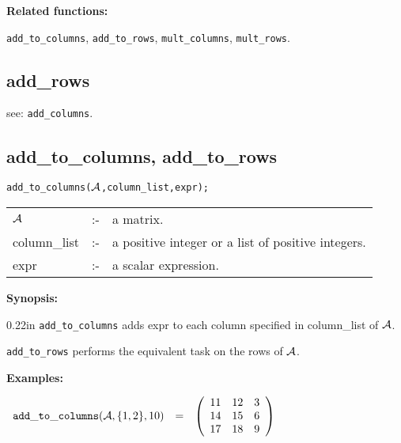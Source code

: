 {\bf Related functions:}

\hspace*{0.175in} {\tt add\_to\_columns}, {\tt add\_to\_rows},
{\tt mult\_columns}, {\tt mult\_rows}.


\subsection{add\_rows}

\hspace*{0.175in} see: {\tt add\_columns}.


\subsection{add\_to\_columns, add\_to\_rows}


\hspace*{0.175in} {\tt add\_to\_columns(${\cal A}$,column\_list,expr);}

\hspace*{0.1in}
\begin{tabular}{l l l}
${\cal A}$   &:-& a matrix. \\
column\_list &:-& a positive integer or a list of positive integers. \\
expr        &:-& a scalar expression.
\end{tabular}

{\bf Synopsis:} %

\begin{addtolength}{\leftskip}{0.22in}
{\tt add\_to\_columns} adds expr to each column specified in
column\_list of ${\cal A}$.

{\tt add\_to\_rows} performs the equivalent task on the rows of
${\cal A}$.

\end{addtolength}

{\bf Examples:}

\begin{flushleft}
\hspace*{0.175in}
\begin{math}
\begin{array}{ccc}
{\tt add\_to\_columns}({\cal A},\{1,2\},10) & = &
\left( \begin{array}{ccc} 11 & 12 & 3 \\ 14 & 15 & 6 \\ 17 & 18 & 9
\end{array} \right)
\end{array}
\end{math}
\end{flushleft}

